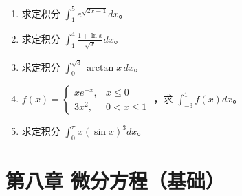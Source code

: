 \documentclass[12pt, a4paper]{article}
\begin{document}
\begin{enumerate}
    \item 求定积分 $ \int_{1}^{5}e^{\sqrt{2x-1}}dx $。

    \item 求定积分 $ \int_{1}^{4}\frac{1+\ln x}{\sqrt{x}}dx $。

    \item 求定积分 $ \int_{0}^{\sqrt{3}} \arctan x \, dx $。

    \item $ f(x)=\begin{cases}xe^{-x}, & x\leq0\\ 3x^{2}, & 0<x\leq1\end{cases} $ ，求 $ \int_{-3}^{1}f(x)dx $。

    \item 求定积分 $ \int_{0}^{\pi} x(\sin x)^{3}dx $。
\end{enumerate}

\section*{第八章 微分方程（基础）}
\end{document}
